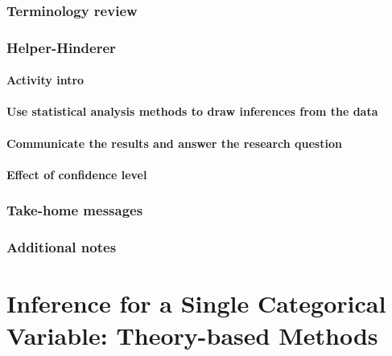 \documentclass[
]{report}
\begin{document}
\subsection{Terminology review}\label{terminology-review-6}

\subsection{Helper-Hinderer}\label{helper-hinderer-2}

\subsubsection*{Activity intro}\label{activity-intro}

\subsubsection*{Use statistical analysis methods to draw inferences from the data}\label{use-statistical-analysis-methods-to-draw-inferences-from-the-data-1}

\subsubsection*{Communicate the results and answer the research question}\label{communicate-the-results-and-answer-the-research-question-1}

\subsubsection*{Effect of confidence level}\label{effect-of-confidence-level}

\subsection{Take-home messages}\label{take-home-messages-7}

\subsection{Additional notes}\label{additional-notes-7}

\chapter{Inference for a Single Categorical Variable: Theory-based Methods}\label{inference-for-a-single-categorical-variable-theory-based-methods}
\end{document}
